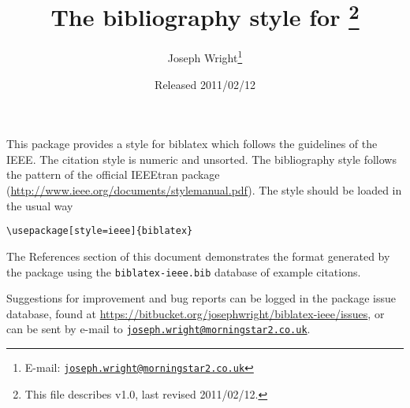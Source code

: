 \documentclass[a4paper]{article}
\author{Joseph Wright\thanks{E-mail: 
  \href{mailto:joseph.wright@morningstar2.co.uk}
  {\texttt{joseph.wright@morningstar2.co.uk}}}}
\title{The \pkg{ieee} bibliography style for \pkg{biblatex}%
  \footnote{This file describes v1.0, last revised 2011/02/12.}}
\date{Released 2011/02/12}
\providecommand*\pkg[1]{\textsf{#1}}
\begin{document}
\maketitle

This package provides a style for \pkg{biblatex} which follows the
guidelines of the IEEE. The citation style is numeric and unsorted. The
bibliography style follows the pattern of the official \pkg{IEEEtran}
package (\url{http://www.ieee.org/documents/stylemanual.pdf}). The style
should be loaded in the usual way
\begin{verbatim}
\usepackage[style=ieee]{biblatex}
\end{verbatim}
The References section of this document demonstrates the format 
generated by the package using the \texttt{biblatex-ieee.bib} database
of example citations.

Suggestions for improvement and bug reports can be logged in the package
issue database, found at
\url{https://bitbucket.org/josephwright/biblatex-ieee/issues}, or can
be sent by e-mail to 
\href{mailto:joseph.wright@morningstar2.co.uk}
  {\texttt{joseph.wright@morningstar2.co.uk}}.

\nocite{*}

\printbibliography
\end{document}
